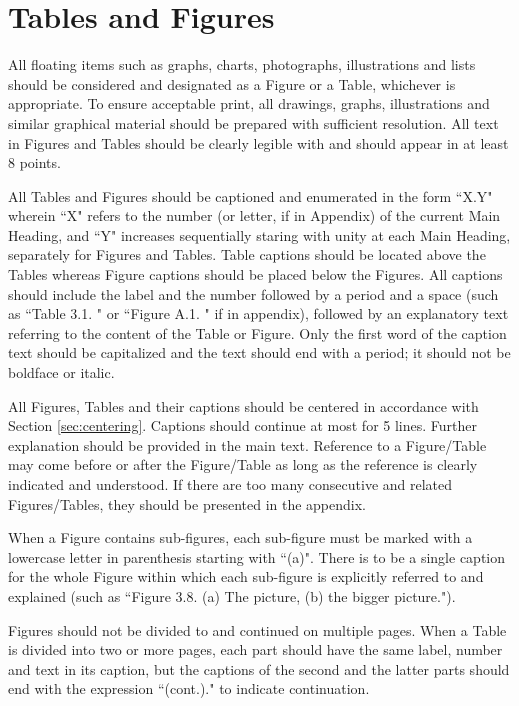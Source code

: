 \documentclass[a4paper,oneside,12pt]{report}
\numberwithin{equation}{chapter}
\begin{document}
\section{Tables and Figures}

All floating items such as graphs,
charts, photographs, illustrations and lists should be considered and
designated as a Figure or a Table, whichever is appropriate. To ensure acceptable print, all drawings, graphs, illustrations and similar graphical material should be prepared with sufficient resolution. All text in Figures and Tables should be clearly legible with and should appear in at least 8 points.

All Tables and Figures should be captioned and enumerated in the form ``X.Y" wherein ``X" refers to the number (or letter, if in Appendix) of the current Main Heading, and ``Y" increases sequentially staring with unity at each Main Heading, separately for Figures and Tables. Table captions should be located above the Tables whereas Figure captions should be placed below the Figures.  All captions should include the label and the number followed by a period and a space (such as ``Table 3.1. " or ``Figure A.1. " if in appendix), followed by an explanatory text referring to the content of the Table or Figure. Only the first word of the caption text should be capitalized and the text should end with a period; it should not be boldface or italic.

All Figures, Tables and their captions should be centered in accordance with Section \ref{sec:centering}. Captions should continue at most for 5 lines. Further explanation should be provided in the main text. Reference to a Figure/Table may come before or after the Figure/Table as long as the reference is clearly indicated and understood. If there are too many consecutive and related Figures/Tables, they should be presented in the appendix.

When a Figure contains sub-figures, each sub-figure must be marked with a lowercase letter in parenthesis starting with ``(a)". There is to be a single caption for the whole Figure within which each sub-figure is explicitly referred to and explained (such as ``Figure 3.8. (a) The picture, (b) the bigger picture.").

Figures should not be divided to and continued on multiple pages. When a Table is divided into two or more pages, each part should have the same label, number and text in its caption, but the captions of the second and the latter parts should end with the expression ``(cont.)." to indicate continuation.
\end{document}
